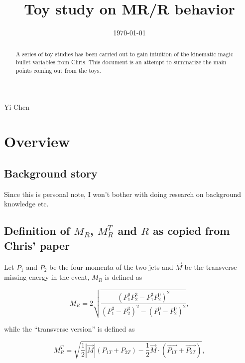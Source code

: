 \documentclass{fheadnote}
\begin{document}
\begin{titlepage}

   \date{\today}

   \title{Toy study on MR/R behavior}

   \begin{Authlist}
      Yi Chen
   \end{Authlist}


  \begin{abstract}
     A series of toy studies has been carried out to gain intuition of the kinematic magic bullet
     variables from Chris.  This document is an attempt to summarize the main points coming out from the toys.
  \end{abstract}

\end{titlepage}

\setcounter{page}{2}

\tableofcontents
\clearpage

\section{Overview}

\subsection{Background story}

Since this is personal note, I won't bother with doing research on background knowledge etc.


\subsection{Definition of $M_R$, $M_R^T$ and $R$ as copied from Chris' paper}

Let $P_1$ and $P_2$ be the four-momenta of the two jets and $\overrightarrow{M}$ be the transverse missing energy in the event, $M_R$ is defined as

\begin{equation}
M_R = 2 \sqrt{\dfrac{(P_1^0 P_2^3 - P_1^3 P_2^0)^2}{(P_1^3 - P_2^3)^2 - (P_1^0 - P_2^0)^2}},
\end{equation}

while the ``transverse version'' is defined as

\begin{equation}
M_R^T = \sqrt{\dfrac{1}{2} |\overrightarrow{M}| (P_{1T} + P_{2T}) - \dfrac{1}{2} \overrightarrow{M} \cdot (\overrightarrow{P_{1T}} + \overrightarrow{P_{2T}})},
\end{equation} 
\end{document}
